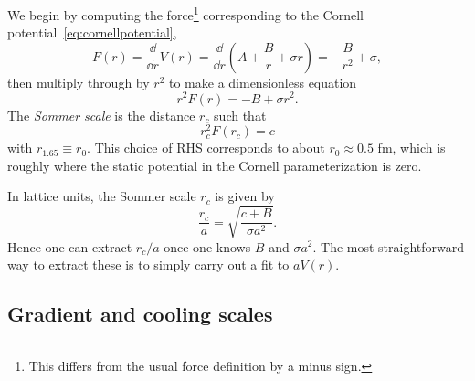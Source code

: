 We begin by computing the force\footnote{This differs from the usual
force definition by a minus sign.} corresponding to the Cornell
potential~\eqref{eq:cornellpotential},
\begin{equation}
  F(r)=\frac{\dd}{\dd r}V(r)
      =\frac{\dd}{\dd r}\left(A+\frac{B}{r}+\sigma r\right)
      =-\frac{B}{r^2}+\sigma,
\end{equation}
then multiply through by $r^2$ to make a dimensionless equation
\begin{equation}
  r^2F(r)=-B+\sigma r^2.
\end{equation}
The {\it Sommer scale} is the distance $r_c$ such that
\begin{equation}
  r_c^2F(r_c)=c
\end{equation}
with $r_{1.65}\equiv r_0$. This choice of RHS corresponds to
about $r_0\approx 0.5$ fm, which is roughly where the static potential in the
Cornell parameterization is zero.

In lattice units, the Sommer scale $r_c$ is given by
\begin{equation}
  \frac{r_c}{a}=\sqrt{\frac{c+B}{\sigma a^2}}.
\end{equation}
Hence one can extract $r_c/a$ once one knows $B$ and $\sigma a^2$. The most
straightforward way to extract these is
to simply carry out a fit to $aV(r)$.

\subsection{Gradient and cooling scales}\label{sec:gradcool}


